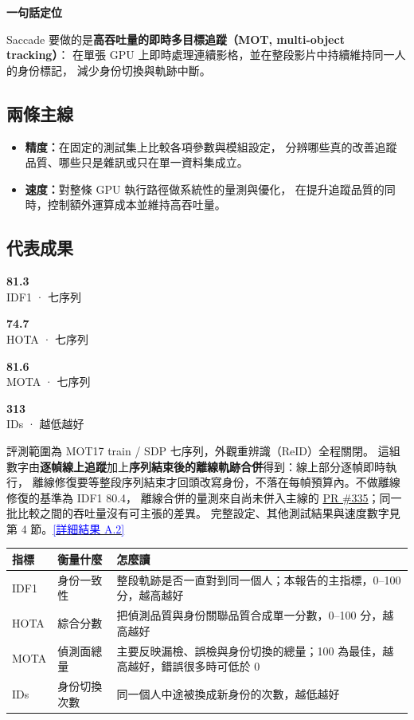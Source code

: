 \documentclass[10pt,a4paper]{ctexart}
\newcommand{\metric}[2]{%
  \begin{minipage}[t]{0.225\linewidth}\centering
    {\sffamily\bfseries\LARGE\color{Navy}#1}\\[-1pt]
    {\sffamily\scriptsize\color{GrayText}#2}
  \end{minipage}}
\newcommand{\applink}[2]{\hyperref[#1]{\textcolor{Blue}{[#2]}}}
\newcommand{\pr}[1]{\href{https://github.com/raylei50653/saccade/pull/#1}{PR \##1}}
\newcommand{\tighttable}{\small\setlength{\tabcolsep}{4pt}}
\begin{document}
\begin{headline}
  {\sffamily\bfseries\large 一句話定位}\par
  Saccade 要做的是\textbf{高吞吐量的即時多目標追蹤（MOT, multi-object tracking）}：
  在單張 GPU 上即時處理連續影格，並在整段影片中持續維持同一人的身份標記，
  減少身份切換與軌跡中斷。
\end{headline}

\subsection{兩條主線}

\begin{itemize}
  \item \textbf{精度：}在固定的測試集上比較各項參數與模組設定，
  分辨哪些真的改善追蹤品質、哪些只是雜訊或只在單一資料集成立。
  \item \textbf{速度：}對整條 GPU 執行路徑做系統性的量測與優化，
  在提升追蹤品質的同時，控制額外運算成本並維持高吞吐量。
\end{itemize}

\subsection{代表成果}

\begin{center}
  \metric{81.3}{IDF1 · 七序列}\hfill
  \metric{74.7}{HOTA · 七序列}\hfill
  \metric{81.6}{MOTA · 七序列}\hfill
  \metric{313}{IDs · 越低越好}
\end{center}

評測範圍為 MOT17 train / SDP 七序列，外觀重辨識（ReID）全程關閉。
這組數字由\textbf{逐幀線上追蹤}加上\textbf{序列結束後的離線軌跡合併}得到：線上部分逐幀即時執行，
離線修復要等整段序列結束才回頭改寫身份，不落在每幀預算內。不做離線修復的基準為 IDF1 80.4，
離線合併的量測來自尚未併入主線的 \pr{335}；同一批比較之間的吞吐量沒有可主張的差異。
完整設定、其他測試結果與速度數字見第 4 節。\applink{app:A2}{詳細結果 A.2}

\tighttable
\begin{tabularx}{\linewidth}{@{}P{14mm}P{24mm}Y@{}}
\toprule
指標 & 衡量什麼 & 怎麼讀\\
\midrule
IDF1 & 身份一致性 & 整段軌跡是否一直對到同一個人；本報告的主指標，0--100 分，越高越好\\
HOTA & 綜合分數 & 把偵測品質與身份關聯品質合成單一分數，0--100 分，越高越好\\
MOTA & 偵測面總量 & 主要反映漏檢、誤檢與身份切換的總量；100 為最佳，越高越好，錯誤很多時可低於 0\\
IDs & 身份切換次數 & 同一個人中途被換成新身份的次數，越低越好\\
\bottomrule
\end{tabularx}
\end{document}
